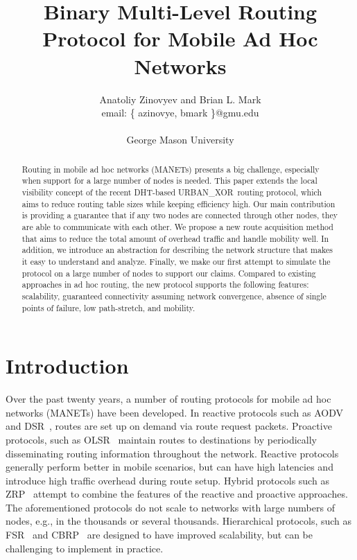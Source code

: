 \documentclass[conference]{IEEEtran}
\title{Binary Multi-Level Routing Protocol for Mobile Ad Hoc Networks}
\author{
  Anatoliy Zinovyev and Brian L. Mark \\
  email:   \{ azinovye, bmark \}@gmu.edu \\
   \\
  George Mason University \\
}
\theoremstyle{definition}
\newcommand{\urbanxor}{URBAN\_XOR}
\begin{document}
\maketitle

\begin{abstract}
Routing in mobile ad hoc networks (MANETs) presents a big challenge, especially when support for a large number of nodes is needed. This paper extends the local visibility concept of the recent DHT-based \urbanxor~routing protocol, which aims to reduce routing table sizes while keeping efficiency high. Our main contribution is providing a guarantee that if any two nodes are connected through other nodes, they are able to communicate with each other. We propose a new route acquisition method that aims to reduce the total amount of overhead traffic and handle mobility well. In addition, we introduce an abstraction for describing the network structure that makes it easy to understand and analyze. Finally, we make our first attempt to simulate the protocol on a large number of nodes to support our claims. Compared to existing approaches in ad hoc routing, the new protocol supports the following features:  scalability, guaranteed connectivity assuming network convergence, absence of single points of failure, low path-stretch, and mobility.
\end{abstract}



\section{Introduction}
\label{sec:introduction}

Over the past twenty years, a number of routing protocols for mobile ad hoc networks (MANETs) have been developed.
In reactive protocols such as AODV~\cite{aodv} and DSR~\cite{dsr}, routes are set up  on demand via route request packets.  Proactive protocols, such as OLSR~\cite{olsr} maintain routes to destinations by periodically disseminating routing information throughout the network. Reactive protocols generally perform better in mobile scenarios, but can have high latencies and introduce high traffic overhead during route setup.  Hybrid protocols such as ZRP~\cite{zrp} attempt to combine the features of the reactive and proactive approaches.  The aforementioned protocols do not scale to networks with large numbers of nodes, e.g., in the thousands or several thousands.  Hierarchical protocols, such as FSR~\cite{fsr} and CBRP~\cite{cbrp} are designed to have improved scalability, but can be challenging to implement in practice.  
  
\end{document}
